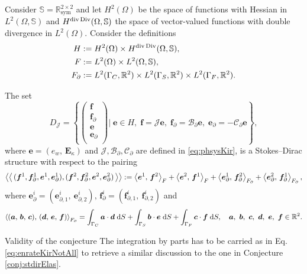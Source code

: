 \begin{conjecture}\label{conj:stdirKir}
	Consider $\mathbb{S} = \mathbb{R}^{2\times 2}_{\text{sym}}$ and
	let $H^{2}(\Omega)$ be the space of functions with Hessian in $L^2(\Omega, \mathbb{S})$ and $H^{\div\Div}  (\Omega, \mathbb{S})$ the space of vector-valued functions with double divergence in $L^2(\Omega)$. Consider the definitions
	\begin{align*}
	H &:=H^{2}(\Omega) \times H^{\div\Div}(\Omega, \mathbb{S}), \\
	F &:= L^2(\Omega) \times L^2(\Omega, \mathbb{S}), \\
	F_\partial &:= L^2(\Gamma_C, \mathbb{R}^2) \times L^2(\Gamma_S, \mathbb{R}^2) \times L^2(\Gamma_F, \mathbb{R}^2). 
	\end{align*}
	
	The set 
	\begin{equation}
	{D}_{\mathcal{J}} = \left\{
	\begin{pmatrix}
	\bm{f} \\ \bm{f}_\partial \\ \bm{e} \\ \bm{e}_\partial \\
	\end{pmatrix}
	\vert \;
	\bm{e} \in H, \; \bm{f} = \mathcal{J} \bm{e}, \;\bm{f}_\partial = \mathcal{B}_\partial \bm{e}, \; \bm{e}_\partial = -\mathcal{C}_\partial \bm{e}   \right\},
	\end{equation}
	where $\bm{e} = ({e}_w, \, \bm{E}_\kappa)$ and $\mathcal{J, B_\partial, C_\partial}$ are defined in \eqref{eq:phsysKir}, is a Stokes–Dirac structure with respect to the pairing
	\begin{equation}\label{eq:bilinearKir}
	\bilprod{(\bm{f}^1, \bm{f}_{\partial}^1, \bm{e}^1, \bm{e}_{\partial}^1)}{(\bm{f}^2, \bm{f}_{\partial}^2, \bm{e}^2, \bm{e}_{\partial}^2)}  := \inner[F]{\bm{e}^1}{\bm{f}^2} + \inner[F]{\bm{e}^2}{\bm{f}^1} + \inner[F_\partial]{\bm{e}_{\partial}^1}{\bm{f}_{\partial}^2} + \inner[F_\partial]{\bm{e}_{\partial}^2}{\bm{f}_{\partial}^1},
	\end{equation}
	where $\bm{e}_{\partial}^i = (\bm{e}_{\partial, 1}^i, \ \bm{e}_{\partial, 2}^i), \, \bm{f}_{\partial}^i = (\bm{f}_{\partial, 1}^i, \ \bm{f}_{\partial, 2}^i)$ and
	\begin{equation*}
	\inner[F_\partial]{(\bm{a}, \, \bm{b}, \, \bm{c})}{(\bm{d}, \, \bm{e}, \, \bm{f})} = \int_{\Gamma_C} \bm{a} \cdot \bm{d} \d{S} + \int_{\Gamma_S} \bm{b} \cdot \bm{e} \d{S}  + \int_{\Gamma_F} \bm{c} \cdot \bm{f} \d{S}, \quad \bm{a},\ \bm{b},\ \bm{c},\ \bm{d},\ \bm{e},\ \bm{f} \in \mathbb{R}^2. 
	\end{equation*}
	
	\begin{paragraph}{Validity of the conjecture}
		The integration by parts has to be carried as in Eq. \eqref{eq:enrateKirNotAll} to retrieve a similar discussion to the one in Conjecture \ref{conj:stdirElas}.
	\end{paragraph}

\end{conjecture}


